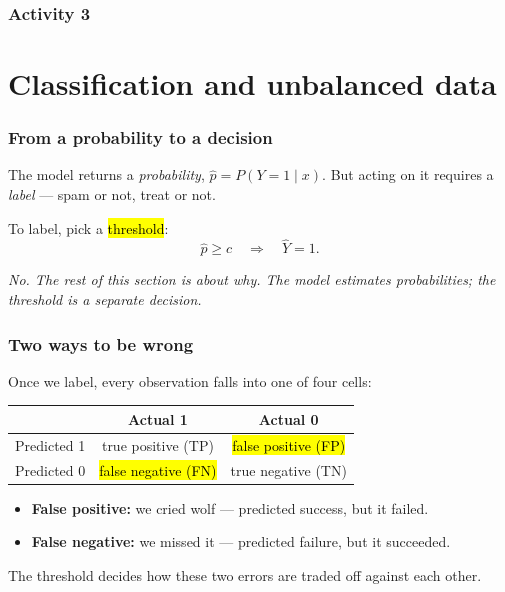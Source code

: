 \documentclass[slidestop,compress,mathserif]{beamer}
\newcommand{\soln}[1]{\textit{#1}}
\begin{document}
\begin{frame}
\frametitle{Activity 3}


\pause
{}

\end{frame}
\section{Classification and unbalanced data}
\begin{frame}
\frametitle{From a probability to a decision}

The model returns a \emph{probability}, $\widehat{p}=P(Y=1\mid x)$. But acting on it requires a \emph{label} --- spam or not, treat or not.

\vspace{0.4em}
To label, pick a \hl{threshold}:
$$
\widehat{p}\ge c \quad\Longrightarrow\quad \widehat{Y}=1.
$$
\pause
{}

\pause
\soln{No. The rest of this section is about why. The model estimates probabilities; the threshold is a separate \emph{decision}.}

\end{frame}
\begin{frame}
\frametitle{Two ways to be wrong}

Once we label, every observation falls into one of four cells:

\begin{center}
\begin{tabular}{l c c}
\toprule
 & Actual 1 & Actual 0 \\
\midrule
Predicted 1 & true positive (TP) & \hl{false positive (FP)} \\
Predicted 0 & \hl{false negative (FN)} & true negative (TN) \\
\bottomrule
\end{tabular}
\end{center}

\vspace{0.5em}
\begin{itemize}
\item \textbf{False positive:} we cried wolf --- predicted success, but it failed.
\item \textbf{False negative:} we missed it --- predicted failure, but it succeeded.
\end{itemize}

The threshold decides how these two errors are traded off against each other.

\end{frame}
\end{document}
